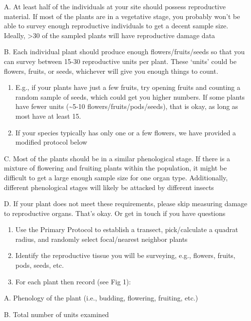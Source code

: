 \documentclass[
  letterpaper,
  DIV=11,
  numbers=noendperiod]{scrreprt}
\begin{document}
A. At least half of the individuals at your site should possess
reproductive material. If most of the plants are in a vegetative stage,
you probably won't be able to survey enough reproductive individuals to
get a decent sample size. Ideally, \textgreater30 of the sampled plants
will have reproductive damage data

B. Each individual plant should produce enough flowers/fruits/seeds so
that you can survey between 15-30 reproductive units per plant. These
`units' could be flowers, fruits, or seeds, whichever will give you
enough things to count.

\begin{enumerate}
\def\labelenumi{\roman{enumi}.}
\item
  E.g., if your plants have just a few fruits, try opening fruits and
  counting a random sample of seeds, which could get you higher numbers.
  If some plants have fewer units (\textasciitilde5-10
  flowers/fruits/pods/seeds), that is okay, as long as most have at
  least 15.
\item
  If your species typically has only one or a few flowers, we have
  provided a modified protocol below
\end{enumerate}

C. Most of the plants should be in a similar phenological stage. If
there is a mixture of flowering and fruiting plants within the
population, it might be difficult to get a large enough sample size for
one organ type. Additionally, different phenological stages will likely
be attacked by different insects

D. If your plant does not meet these requirements, please skip measuring
damage to reproductive organs. That's okay. Or get in touch if you have
questions

\begin{enumerate}
\def\labelenumi{\arabic{enumi}.}
\setcounter{enumi}{1}
\item
  Use the Primary Protocol to establish a transect, pick/calculate a
  quadrat radius, and randomly select focal/nearest neighbor plants
\item
  Identify the reproductive tissue you will be surveying, e.g., flowers,
  fruits, pods, seeds, etc.
\item
  For each plant then record (see Fig 1):
\end{enumerate}

A. Phenology of the plant (i.e., budding, flowering, fruiting, etc.)

B. Total number of units examined
\end{document}
